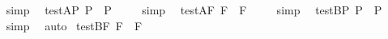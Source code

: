 \begin{isabellebody}
\isadelimproof
\ %
\endisadelimproof
%
\isatagproof
{}\isamarkupfalse%
\ simp\ \isamarkupfalse%
%
\endisatagproof
{\isafoldproof}%
%
\isadelimproof
%
\endisadelimproof
\isanewline
\isanewline
{}\isamarkupfalse%
\ test{\isacharunderscore}A{\isacharunderscore}P{\isacharcolon}\ {\isachardoublequoteopen}{\isacharbrackleft}\isactrlbold {\isasymbox}{\isacharparenleft}\isactrlbold {\isasymdiamond}{\isacharparenleft}{\isasymphi}\isactrlsup P{\isacharparenright}{\isacharparenright}\ \isactrlbold {\isasymrightarrow}\ \isactrlbold {\isasymdiamond}{\isacharparenleft}{\isasymphi}\isactrlsup P{\isacharparenright}{\isacharbrackright}\ {\isacharequal}\ {\isasymtop}{\isachardoublequoteclose}%
\isadelimproof
\ %
\endisadelimproof
%
\isatagproof
{}\isamarkupfalse%
\ simp\ \isamarkupfalse%
%
\endisatagproof
{\isafoldproof}%
%
\isadelimproof
%
\endisadelimproof
\isanewline
{}\isamarkupfalse%
\ test{\isacharunderscore}A{\isacharunderscore}F{\isacharcolon}\ {\isachardoublequoteopen}{\isacharbrackleft}\isactrlbold {\isasymbox}{\isacharparenleft}\isactrlbold {\isasymdiamond}{\isacharparenleft}{\isasymphi}\isactrlsup F{\isacharparenright}{\isacharparenright}\ \isactrlbold {\isasymrightarrow}\ \isactrlbold {\isasymdiamond}{\isacharparenleft}{\isasymphi}\isactrlsup F{\isacharparenright}{\isacharbrackright}\ {\isacharequal}\ {\isasymtop}{\isachardoublequoteclose}%
\isadelimproof
\ %
\endisadelimproof
%
\isatagproof
{}\isamarkupfalse%
\ simp\ \isamarkupfalse%
%
\endisatagproof
{\isafoldproof}%
%
\isadelimproof
%
\endisadelimproof
\isanewline
\isanewline
{}\isamarkupfalse%
\ test{\isacharunderscore}B{\isacharunderscore}P{\isacharcolon}\ {\isachardoublequoteopen}{\isacharbrackleft}\isactrlbold {\isasymdiamond}{\isacharparenleft}\isactrlbold {\isasymbox}{\isacharparenleft}{\isasymphi}\isactrlsup P{\isacharparenright}{\isacharparenright}\ \isactrlbold {\isasymrightarrow}\ \isactrlbold {\isasymdiamond}{\isacharparenleft}{\isasymphi}\isactrlsup P{\isacharparenright}{\isacharbrackright}\ {\isacharequal}\ {\isasymtop}{\isachardoublequoteclose}%
\isadelimproof
\ %
\endisadelimproof
%
\isatagproof
{}\isamarkupfalse%
\ simp\ \isamarkupfalse%
\ auto%
\endisatagproof
{\isafoldproof}%
%
\isadelimproof
%
\endisadelimproof
\isanewline
{}\isamarkupfalse%
\ test{\isacharunderscore}B{\isacharunderscore}F{\isacharcolon}\ {\isachardoublequoteopen}{\isacharbrackleft}\isactrlbold {\isasymdiamond}{\isacharparenleft}\isactrlbold {\isasymbox}{\isacharparenleft}{\isasymphi}\isactrlsup F{\isacharparenright}{\isacharparenright}\ \isactrlbold {\isasymrightarrow}\ \isactrlbold {\isasymdiamond}{\isacharparenleft}{\isasymphi}\isactrlsup F{\isacharparenright}{\isacharbrackright}\ {\isacharequal}\ {\isasymtop}{\isachardoublequoteclose}%

\end{isabellebody}
